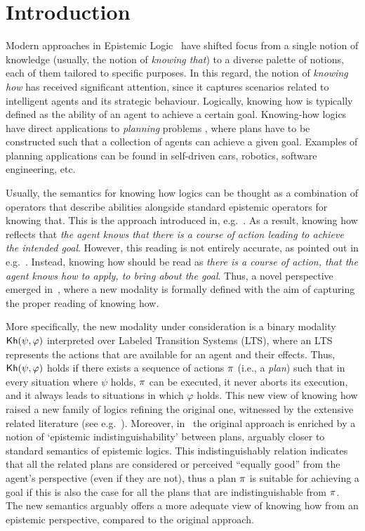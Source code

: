 \section{Introduction}
\label{sec:intro}

Modern approaches in Epistemic Logic~\cite{vonWright:1951,Hintikka:1962} have shifted focus from a single notion of knowledge (usually, the notion of \emph{knowing that}) to a diverse palette of notions, each of them tailored to specific purposes. In this regard, the notion of \emph{knowing how} has received significant attention, since it captures scenarios related to intelligent agents and its strategic behaviour. Logically, knowing how is typically defined as the ability of an agent to achieve a certain goal.  Knowing-how logics have direct applications to \emph{planning} problems \cite{Stuart21},  where  plans have to be constructed such that a collection of agents can achieve a given goal.  Examples of planning applications can be found in self-driven cars,  robotics, software engineering, etc.

Usually,  the semantics for knowing how logics can be thought as a combination of operators that describe abilities alongside standard epistemic operators for knowing that.  This is the approach introduced in, e.g.~\cite{Mccarthy69,Moore85,Les00,Hoek00,HerzigT06}. As a result, knowing how reflects that \emph{the agent knows that there is a course of action leading to achieve the intended goal}. However, this reading is not entirely accurate, as pointed out in e.g.~\cite{JamrogaA07,Herzig15}. Instead, knowing how should be read as \emph{there is a course of action, that the agent knows how to apply, to bring about the goal}. Thus, a novel perspective emerged in~\cite{Wang15lori,Wang16,Wang2016}, where a new modality is formally defined with the aim of capturing the proper reading of knowing how. 

More specifically, the new modality under consideration is a binary modality ${\mathsf{Kh}}(\psi,\varphi)$ interpreted over Labeled Transition Systems (LTS), where an LTS represents the  actions that are available for an agent and their effects. Thus, ${\mathsf{Kh}}(\psi,\varphi)$ holds if there exists a sequence of actions $\pi$ (i.e., a \emph{plan}) such that in every situation where $\psi$ holds, $\pi$ can be executed, it never aborts its execution, and it always leads to situations in which $\varphi$ holds. This new view of knowing how raised a new family of logics refining the original one, witnessed by the extensive related literature (see e.g.~\cite{LiWang17,Li17,FervariHLW17,NaumovT19,Naumov2018a}). Moreover, in~\cite{AFSVQ21,AFSVQ23} the original approach is enriched by a notion of `epistemic indistinguishability' between plans, arguably closer to standard semantics of epistemic logics. This indistinguishably relation indicates that all the related plans are considered or perceived ``equally good''
from the agent's perspective (even if they are not), thus a plan $\pi$ is suitable for achieving a goal if this is also the case for all the plans that are indistinguishable from $\pi$. The new semantics arguably offers a more adequate view of knowing how from an epistemic perspective, compared to the original approach.

